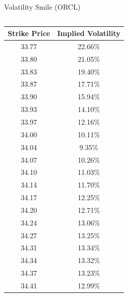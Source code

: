\documentclass{beamer}
\begin{document}
\begin{frame}[shrink=50]{{\color{cyan}Volatility Smile ({\color{magenta}ORCL})}}
\bigskip
\begin{columns}

\begin{column}{0.3\textwidth}
\begin{table}[H]
\begin{center}
\begin{tabular}{cc}
\hline 
\textbf{Strike Price}	& \textbf{Implied Volatility}\\
\hline \hline
33.77	& 22.66\%\\
33.80	& 21.05\%\\
33.83	& 19.40\%\\
33.87	& 17.71\%\\
33.90	& 15.94\%\\
33.93	& 14.10\%\\
33.97	& 12.16\%\\
34.00	& 10.11\%\\
{\color{orange}34.04}	& 9.35\%\\
34.07	& 10.26\%\\
34.10	& 11.03\%\\
34.14	& 11.70\%\\
34.17	& 12.25\%\\
34.20	& 12.71\%\\
34.24	& 13.06\%\\
34.27	& 13.25\%\\
34.31	& 13.34\%\\
34.34	& 13.32\%\\
34.37	& 13.23\%\\
34.41	& 12.99\%\\
\hline 
\end{tabular}
\label{tab:ORCL_volatility_smile}
\end{center} 
\end{table} 
\end{column}


\end{columns}
\end{frame}
\end{document}
